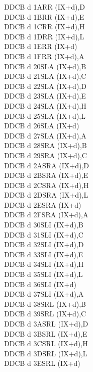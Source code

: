 \documentclass[12pt,twoside,openright,a4paper]{book}
\begin{document}
\begin{multicols}{3}
{\begin{tabbing}
	DDCB d 1A\>RR (IX+d),D\UNDOC\\
	DDCB d 1B\>RR (IX+d),E\UNDOC\\
	DDCB d 1C\>RR (IX+d),H\UNDOC\\
	DDCB d 1D\>RR (IX+d),L\UNDOC\\
	DDCB d 1E\>RR (IX+d)\\
	DDCB d 1F\>RR (IX+d),A\UNDOC\\
	DDCB d 20\>SLA (IX+d),B\UNDOC\\
	DDCB d 21\>SLA (IX+d),C\UNDOC\\
	DDCB d 22\>SLA (IX+d),D\UNDOC\\
	DDCB d 23\>SLA (IX+d),E\UNDOC\\
	DDCB d 24\>SLA (IX+d),H\UNDOC\\
	DDCB d 25\>SLA (IX+d),L\UNDOC\\
	DDCB d 26\>SLA (IX+d)\\
	DDCB d 27\>SLA (IX+d),A\UNDOC\\
	DDCB d 28\>SRA (IX+d),B\UNDOC\\
	DDCB d 29\>SRA (IX+d),C\UNDOC\\
	DDCB d 2A\>SRA (IX+d),D\UNDOC\\
	DDCB d 2B\>SRA (IX+d),E\UNDOC\\
	DDCB d 2C\>SRA (IX+d),H\UNDOC\\
	DDCB d 2D\>SRA (IX+d),L\UNDOC\\
	DDCB d 2E\>SRA (IX+d)\\
	DDCB d 2F\>SRA (IX+d),A\UNDOC\\
	DDCB d 30\>SLI (IX+d),B\UNDOC\\
	DDCB d 31\>SLI (IX+d),C\UNDOC\\
	DDCB d 32\>SLI (IX+d),D\UNDOC\\
	DDCB d 33\>SLI (IX+d),E\UNDOC\\
	DDCB d 34\>SLI (IX+d),H\UNDOC\\
	DDCB d 35\>SLI (IX+d),L\UNDOC\\
	DDCB d 36\>SLI (IX+d)\UNDOC\\
	DDCB d 37\>SLI (IX+d),A\UNDOC\\
	DDCB d 38\>SRL (IX+d),B\UNDOC\\
	DDCB d 39\>SRL (IX+d),C\UNDOC\\
	DDCB d 3A\>SRL (IX+d),D\UNDOC\\
	DDCB d 3B\>SRL (IX+d),E\UNDOC\\
	DDCB d 3C\>SRL (IX+d),H\UNDOC\\
	DDCB d 3D\>SRL (IX+d),L\UNDOC\\
	DDCB d 3E\>SRL (IX+d)\\

\end{tabbing}}
\end{multicols}
\end{document}
